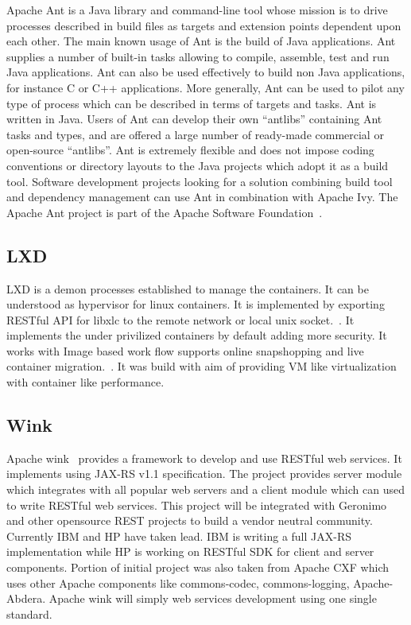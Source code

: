 {Apache Ant is a Java library and command-line tool whose mission is to
drive processes described in build files as targets and extension
points dependent upon each other. The main known usage of Ant is the
build of Java applications. Ant supplies a number of built-in tasks
allowing to compile, assemble, test and run Java applications. Ant can
also be used effectively to build non Java applications, for instance
C or C++ applications. More generally, Ant can be used to pilot any
type of process which can be described in terms of targets and
tasks. Ant is written in Java. Users of Ant can develop their own
``antlibs'' containing Ant tasks and types, and are offered a large
number of ready-made commercial or open-source ``antlibs''. Ant is
extremely flexible and does not impose coding conventions or directory
layouts to the Java projects which adopt it as a build tool. Software
development projects looking for a solution combining build tool and
dependency management can use Ant in combination with Apache Ivy. The
Apache Ant project is part of the Apache Software
Foundation~\cite{ant-www}.

\subsection{LXD \cv}

LXD is a demon processes established to manage the containers. It can
be understood as hypervisor for linux containers. It is implemented by
exporting RESTful API for libxlc to the remote network or local unix
socket.~\cite{www-lxd-thevarguy}. It implements the under privilized
containers by default adding more security. It works with Image based
work flow supports online snapshopping and live container
migration.~\cite{www-lxd-lists-linux}. It was build with aim of
providing VM like virtualization with container like
performance.~\cite{www-lxd-ubuntu}

\subsection{Wink \cv}

Apache wink~\cite{www-apache-wink} provides a framework to develop and
use RESTful web services. It implements using JAX-RS v1.1
specification. The project provides server module which integrates
with all popular web servers and a client module which can used to
write RESTful web services. This project will be integrated with
Geronimo and other opensource REST projects to build a vendor neutral
community. Currently IBM and HP have taken lead. IBM is writing a full
JAX-RS implementation while HP is working on RESTful SDK for client
and server components.  Portion of initial project was also taken from
Apache CXF which uses other Apache components like commons-codec,
commons-logging, Apache-Abdera. Apache wink will simply web services
development using one single standard.

}
